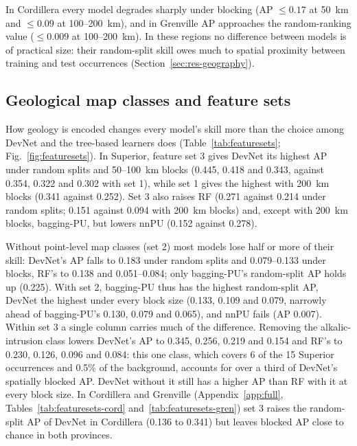 \documentclass[pdflatex,sn-apa]{sn-jnl}
\begin{document}
In Cordillera every model degrades sharply under blocking (AP $\leq 0.17$ at 50~km and $\leq 0.09$ at 100--200~km), and in Grenville AP approaches the random-ranking value ($\leq 0.009$ at 100--200~km). In these regions no difference between models is of practical size: their random-split skill owes much to spatial proximity between training and test occurrences (Section~\ref{sec:res-geography}).

\subsection{Geological map classes and feature sets}\label{sec:res-featuresets}

How geology is encoded changes every model's skill more than the choice among DevNet and the tree-based learners does (Table~\ref{tab:featuresets}; Fig.~\ref{fig:featuresets}). In Superior, feature set 3 gives DevNet its highest AP under random splits and 50--100~km blocks (0.445, 0.418 and 0.343, against 0.354, 0.322 and 0.302 with set 1), while set 1 gives the highest with 200~km blocks (0.341 against 0.252). Set 3 also raises RF (0.271 against 0.214 under random splits; 0.151 against 0.094 with 200~km blocks) and, except with 200~km blocks, bagging-PU, but lowers nnPU (0.152 against 0.278).

Without point-level map classes (set 2) most models lose half or more of their skill: DevNet's AP falls to 0.183 under random splits and 0.079--0.133 under blocks, RF's to 0.138 and 0.051--0.084; only bagging-PU's random-split AP holds up (0.225). With set 2, bagging-PU thus has the highest random-split AP, DevNet the highest under every block size (0.133, 0.109 and 0.079, narrowly ahead of bagging-PU's 0.130, 0.079 and 0.065), and nnPU fails (AP 0.007). Within set 3 a single column carries much of the difference. Removing the alkalic-intrusion class lowers DevNet's AP to 0.345, 0.256, 0.219 and 0.154 and RF's to 0.230, 0.126, 0.096 and 0.084: this one class, which covers 6 of the 15 Superior occurrences and 0.5\% of the background, accounts for over a third of DevNet's spatially blocked AP. DevNet without it still has a higher AP than RF with it at every block size. In Cordillera and Grenville (Appendix~\ref{app:full}, Tables~\ref{tab:featuresets-cord} and~\ref{tab:featuresets-gren}) set 3 raises the random-split AP of DevNet in Cordillera (0.136 to 0.341) but leaves blocked AP close to chance in both provinces.
\end{document}
